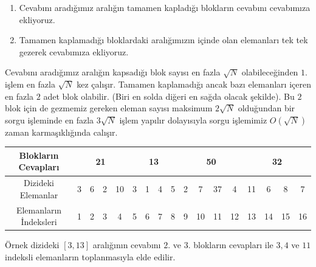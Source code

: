 \documentclass[12pt]{article}
\begin{document}
	\begin{enumerate}
	    \item Cevab{\i}n{\i} arad{\i}\u{g}{\i}m{\i}z aral{\i}\u{g}{\i}n tamamen kaplad{\i}\u{g}{\i} bloklar{\i}n cevab{\i}n{\i} cevab{\i}m{\i}za ekliyoruz.
	    
	    \item Tamamen kaplamad{\i}\u{g}{\i} bloklardaki aral{\i}\u{g}{\i}m{\i}z{\i}n i\c{c}inde olan elemanlar{\i} tek tek gezerek cevab{\i}m{\i}za ekliyoruz.
	    
	\end{enumerate}
	
     Cevab{\i}n{\i} arad{\i}\u{g}{\i}m{\i}z aral{\i}\u{g}{\i}n kapsad{\i}\u{g}{\i} blok say{\i}s{\i} en fazla $\sqrt{N}$ olabilece\u{g}inden $1.$ i\c{s}lem en fazla $\sqrt{N}$ kez \c{c}al{\i}\c{s}{\i}r. Tamamen kaplamad{\i}\u{g}{\i} ancak baz{\i} elemanlar{\i} i\c{c}eren en fazla $2$ adet blok olabilir. (Biri en solda di\u{g}eri en sa\u{g}da olacak \c{s}ekilde). Bu $2$ blok i\c{c}in de gezmemiz gereken eleman say{\i}s{\i} maksimum $2\sqrt{N}$ oldu\u{g}undan bir sorgu i\c{s}leminde en fazla $3\sqrt{N}$ i\c{s}lem yap{\i}l{\i}r dolay{\i}s{\i}yla sorgu i\c{s}lemimiz $O({\sqrt{N}})$ zaman karma\c{s}{\i}kl{\i}\u{g}{\i}nda cal{\i}\c{s}{\i}r.
    
    \begin{table}[h]
    \begin{tabular}{|c|c|c|c|c|c|c|c|c|c|c|c|c|c|c|c|c|}
    \hline
    Bloklar{\i}n Cevaplar{\i}    & \multicolumn{4}{c|}{21}                                        & \multicolumn{4}{c|}{\cellcolor[HTML]{FFFE65}13} & \multicolumn{4}{c|}{\cellcolor[HTML]{FFFE65}50} & \multicolumn{4}{c|}{32}                   \\ \hline
    Dizideki Elemanlar     & 3 & 6 & \cellcolor[HTML]{FFFE65}2 & \cellcolor[HTML]{FFFE65}10 & 3          & 1          & 4         & 5         & 2         & 7          & 37         & 4         & \cellcolor[HTML]{FFFE65}11 & 6  & 8  & 7  \\ \hline
    Elemanlar{\i}n \.{I}ndeksleri & 1 & 2 & 3                         & 4                          & 5          & 6          & 7         & 8         & 9         & 10         & 11         & 12        & 13                         & 14 & 15 & 16 \\ \hline
    \end{tabular}
    \end{table}
    
    \"{O}rnek dizideki $[3,13]$ aral{\i}\u{g}{\i}n{\i}n cevab{\i}n{\i} $2.$ ve $3.$ bloklar{\i}n cevaplar{\i} ile $3,4$ ve $11$ indeksli elemanlar{\i}n toplanmas{\i}yla elde edilir.
    
\end{document}
